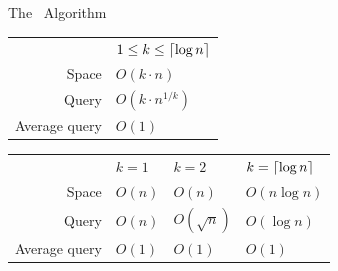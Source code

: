 \documentclass{beamer}
\begin{document}
\begin{frame}{The \fprintk\ Algorithm}
    \begin{tabular}{r l}
        & $1\leq k\leq\lceil\log n\rceil$ \\
        Space & $O(k\cdot n)$\\
        Query & $O(k\cdot n^{1/k})$ \\
        Average query & $O(1)$ \\
    \end{tabular}

    \vspace{2em}

    \begin{tabular}{r l l l}
        & $k=1$ & $k=2$ & $k=\lceil\log n\rceil$ \\
        Space & $O(n)$ & $O(n)$ & $O(n\log n)$ \\
        Query & $O(n)$ & $O(\sqrt n)$ & $O(\log n)$ \\
        Average query & $O(1)$ & $O(1)$ & $O(1)$ \\
    \end{tabular}
\end{frame}
\end{document}
